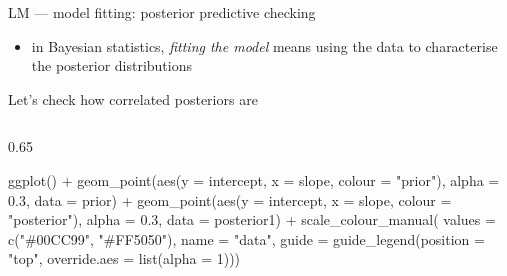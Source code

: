 \documentclass[
  10pt,
  ignorenonframetext,
  aspectratio=169,
  t]{beamer}
\newenvironment{Shaded}{\begin{snugshade}}{\end{snugshade}}
\newcommand{\AttributeTok}[1]{\textcolor[rgb]{0.40,0.45,0.13}{#1}}
\newcommand{\DecValTok}[1]{\textcolor[rgb]{0.68,0.00,0.00}{#1}}
\newcommand{\FloatTok}[1]{\textcolor[rgb]{0.68,0.00,0.00}{#1}}
\newcommand{\FunctionTok}[1]{\textcolor[rgb]{0.28,0.35,0.67}{#1}}
\newcommand{\NormalTok}[1]{\textcolor[rgb]{0.00,0.23,0.31}{#1}}
\newcommand{\SpecialCharTok}[1]{\textcolor[rgb]{0.37,0.37,0.37}{#1}}
\newcommand{\StringTok}[1]{\textcolor[rgb]{0.13,0.47,0.30}{#1}}
\providecommand{\tightlist}{%
  \setlength{\itemsep}{0pt}\setlength{\parskip}{0pt}}
\newcommand{\blueit}[1]{\textcolor{bluebeamer}{\emph{#1}}}
\begin{document}
\begin{frame}[fragile]{LM --- model fitting: posterior predictive
checking}
\protect{}\label{lm-model-fitting-posterior-predictive-checking-1}
\begin{itemize}
\tightlist
\item
  in Bayesian statistics, \blueit{fitting the model} means using the
  data to characterise the posterior distributions
\end{itemize}

Let's check how correlated posteriors are

\begin{columns}[T]
\begin{column}{0.65\linewidth}
\footnotesize

\begin{Shaded}
\begin{Highlighting}[]
\FunctionTok{ggplot}\NormalTok{() }\SpecialCharTok{+}
  \FunctionTok{geom\_point}\NormalTok{(}\FunctionTok{aes}\NormalTok{(}\AttributeTok{y =}\NormalTok{ intercept, }\AttributeTok{x =}\NormalTok{ slope, }\AttributeTok{colour =} \StringTok{"prior"}\NormalTok{),}
             \AttributeTok{alpha =} \FloatTok{0.3}\NormalTok{, }\AttributeTok{data =}\NormalTok{ prior) }\SpecialCharTok{+}
  \FunctionTok{geom\_point}\NormalTok{(}\FunctionTok{aes}\NormalTok{(}\AttributeTok{y =}\NormalTok{ intercept, }\AttributeTok{x =}\NormalTok{ slope, }\AttributeTok{colour =} \StringTok{"posterior"}\NormalTok{),}
             \AttributeTok{alpha =} \FloatTok{0.3}\NormalTok{, }\AttributeTok{data =}\NormalTok{ posterior1) }\SpecialCharTok{+}
  \FunctionTok{scale\_colour\_manual}\NormalTok{(}
    \AttributeTok{values =} \FunctionTok{c}\NormalTok{(}\StringTok{"\#00CC99"}\NormalTok{, }\StringTok{"\#FF5050"}\NormalTok{),}
    \AttributeTok{name =} \StringTok{"data"}\NormalTok{,}
    \AttributeTok{guide =} \FunctionTok{guide\_legend}\NormalTok{(}\AttributeTok{position =} \StringTok{"top"}\NormalTok{,}
                         \AttributeTok{override.aes =} \FunctionTok{list}\NormalTok{(}\AttributeTok{alpha =} \DecValTok{1}\NormalTok{)))}
\end{Highlighting}
\end{Shaded}

\normalsize
{}
\end{column}


\end{columns}
\end{frame}
\end{document}
